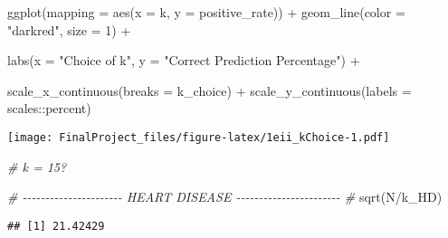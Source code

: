 \documentclass[
]{article}
\newenvironment{Shaded}{\begin{snugshade}}{\end{snugshade}}
\newcommand{\AttributeTok}[1]{\textcolor[rgb]{0.77,0.63,0.00}{#1}}
\newcommand{\CommentTok}[1]{\textcolor[rgb]{0.56,0.35,0.01}{\textit{#1}}}
\newcommand{\DecValTok}[1]{\textcolor[rgb]{0.00,0.00,0.81}{#1}}
\newcommand{\FunctionTok}[1]{\textcolor[rgb]{0.00,0.00,0.00}{#1}}
\newcommand{\NormalTok}[1]{#1}
\newcommand{\SpecialCharTok}[1]{\textcolor[rgb]{0.00,0.00,0.00}{#1}}
\newcommand{\StringTok}[1]{\textcolor[rgb]{0.31,0.60,0.02}{#1}}
\begin{document}
\begin{Shaded}
\begin{Highlighting}[]
  \FunctionTok{ggplot}\NormalTok{(}\AttributeTok{mapping =} \FunctionTok{aes}\NormalTok{(}\AttributeTok{x =}\NormalTok{ k,}
                       \AttributeTok{y =}\NormalTok{ positive\_rate)) }\SpecialCharTok{+}
  \FunctionTok{geom\_line}\NormalTok{(}\AttributeTok{color =} \StringTok{"darkred"}\NormalTok{,}
            \AttributeTok{size =} \DecValTok{1}\NormalTok{) }\SpecialCharTok{+}

  \FunctionTok{labs}\NormalTok{(}\AttributeTok{x =} \StringTok{"Choice of k"}\NormalTok{,}
       \AttributeTok{y =} \StringTok{"Correct Prediction Percentage"}\NormalTok{) }\SpecialCharTok{+}

  \FunctionTok{scale\_x\_continuous}\NormalTok{(}\AttributeTok{breaks =}\NormalTok{ k\_choice) }\SpecialCharTok{+}
  \FunctionTok{scale\_y\_continuous}\NormalTok{(}\AttributeTok{labels =}\NormalTok{ scales}\SpecialCharTok{::}\NormalTok{percent)}
\end{Highlighting}
\end{Shaded}

\texttt{[image: FinalProject\_files/figure-latex/1eii\_kChoice-1.pdf]}

\begin{Shaded}
\begin{Highlighting}[]
\CommentTok{\# k = 15?}

\CommentTok{\# {-}{-}{-}{-}{-}{-}{-}{-}{-}{-}{-}{-}{-}{-}{-}{-}{-}{-}{-}{-}{-}{-} HEART DISEASE {-}{-}{-}{-}{-}{-}{-}{-}{-}{-}{-}{-}{-}{-}{-}{-}{-}{-}{-}{-}{-}{-}{-} \#}
\FunctionTok{sqrt}\NormalTok{(N}\SpecialCharTok{/}\NormalTok{k\_HD)}
\end{Highlighting}
\end{Shaded}

\begin{verbatim}
## [1] 21.42429
\end{verbatim}
\end{document}
